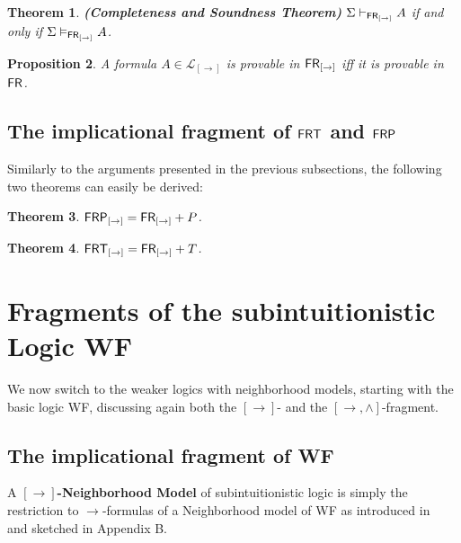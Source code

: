 \documentclass[12pt]{article}
\newtheorem{thm}{Theorem}[section]
\newtheorem{prop}[thm]{Proposition}
\newtheorem{dfn}[thm]{Definition}
\begin{document}
\begin{thm}
\em\textbf{(Completeness and Soundness Theorem)} $ \Sigma\vdash_{{\sf FR_{[\rightarrow ]}} } A $ if and only if $ \Sigma\vDash_{{\sf FR_{[\rightarrow]}} } A $.
\end{thm}

\begin{prop}
A formula $ A \in \mathcal{L}_{[\rightarrow]} $ is provable in $ {\sf FR_{[\rightarrow]}}$ iff it is provable in ${\sf FR}  $.
\end{prop}

\subsection{The implicational fragment of $ {\sf FRT}  $ and $ {\sf FRP}  $}

Similarly to the arguments presented in the previous subsections, the following two theorems can easily be derived:

\begin{thm}
${\sf FRP}_{[\rightarrow]}={\sf FR}_{[\rightarrow]}+  P $.
\end{thm}

\begin{thm}
${\sf FRT}_{[\rightarrow]}={\sf FR}_{[\rightarrow]}+ T $.
\end{thm}


\section{Fragments of the subintuitionistic Logic {\sf WF}}\label{fwf}

We now switch to the weaker logics with neighborhood models, starting with the basic logic {\sf WF}, discussing again both the $[\rightarrow]$- and the  $[\rightarrow,\wedge]$-fragment.

\subsection{The implicational fragment of {\sf WF} }

A \textbf{$[ \rightarrow ]$-Neighborhood Model} of subintuitionistic logic is simply the restriction to $ \rightarrow $-formulas of a Neighborhood model of {\sf WF} as introduced in~\cite{FD} and sketched in Appendix B.

\end{document}
